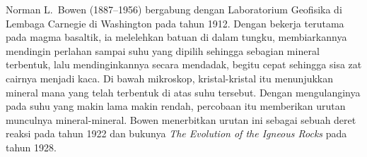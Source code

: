 \begin{history}
Norman L.~Bowen (1887--1956) bergabung dengan Laboratorium Geofisika di Lembaga
Carnegie di Washington pada tahun 1912. Dengan bekerja terutama pada magma
basaltik, ia melelehkan batuan di dalam tungku, membiarkannya mendingin perlahan
sampai suhu yang dipilih sehingga sebagian mineral terbentuk, lalu
mendinginkannya secara mendadak, begitu cepat sehingga sisa zat cairnya menjadi
kaca. Di bawah mikroskop, kristal-kristal itu menunjukkan mineral mana yang
telah terbentuk di atas suhu tersebut. Dengan mengulanginya pada suhu yang makin
lama makin rendah, percobaan itu memberikan urutan munculnya mineral-mineral.
Bowen menerbitkan urutan ini sebagai sebuah deret reaksi pada tahun 1922 dan
bukunya \emph{The Evolution of the Igneous Rocks} pada tahun 1928.
\end{history}

